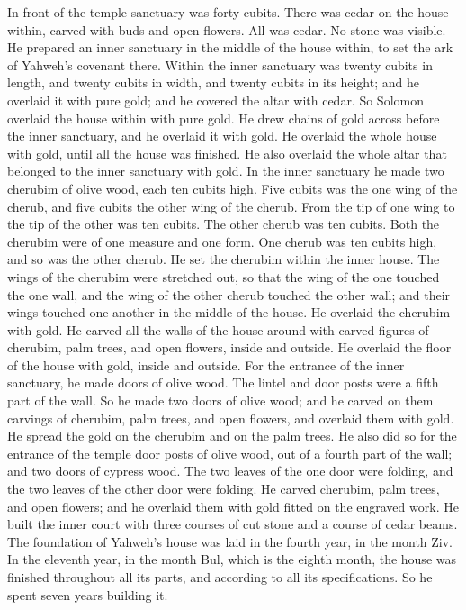 {In front of the temple sanctuary was forty cubits.
There was cedar on the house within, carved with buds and open flowers. All was cedar. No stone was visible.
He prepared an inner sanctuary in the middle of the house within, to set the ark of Yahweh’s covenant there.
Within the inner sanctuary was twenty cubits in length, and twenty cubits in width, and twenty cubits in its height; and he overlaid it with pure gold; and he covered the altar with cedar.
So Solomon overlaid the house within with pure gold. He drew chains of gold across before the inner sanctuary, and he overlaid it with gold.
He overlaid the whole house with gold, until all the house was finished. He also overlaid the whole altar that belonged to the inner sanctuary with gold.
In the inner sanctuary he made two cherubim of olive wood, each ten cubits high.
Five cubits was the one wing of the cherub, and five cubits the other wing of the cherub. From the tip of one wing to the tip of the other was ten cubits.
The other cherub was ten cubits. Both the cherubim were of one measure and one form.
One cherub was ten cubits high, and so was the other cherub.
He set the cherubim within the inner house. The wings of the cherubim were stretched out, so that the wing of the one touched the one wall, and the wing of the other cherub touched the other wall; and their wings touched one another in the middle of the house.
He overlaid the cherubim with gold.
He carved all the walls of the house around with carved figures of cherubim, palm trees, and open flowers, inside and outside.
He overlaid the floor of the house with gold, inside and outside.
For the entrance of the inner sanctuary, he made doors of olive wood. The lintel and door posts were a fifth part of the wall.
So he made two doors of olive wood; and he carved on them carvings of cherubim, palm trees, and open flowers, and overlaid them with gold. He spread the gold on the cherubim and on the palm trees.
He also did so for the entrance of the temple door posts of olive wood, out of a fourth part of the wall;
and two doors of cypress wood. The two leaves of the one door were folding, and the two leaves of the other door were folding.
He carved cherubim, palm trees, and open flowers; and he overlaid them with gold fitted on the engraved work.
He built the inner court with three courses of cut stone and a course of cedar beams.
The foundation of Yahweh’s house was laid in the fourth year, in the month Ziv.
In the eleventh year, in the month Bul, which is the eighth month, the house was finished throughout all its parts, and according to all its specifications. So he spent seven years building it.

}
